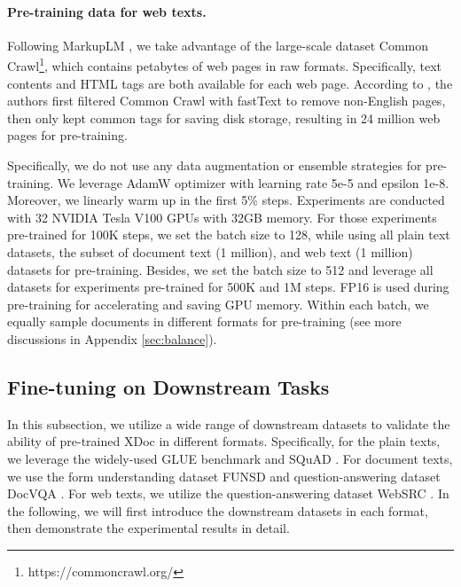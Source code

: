 \documentclass[11pt]{article}
\begin{document}
\paragraph{Pre-training data for web texts.} Following MarkupLM \cite{li2021markuplm}, we take advantage of the large-scale dataset Common Crawl\footnote{https://commoncrawl.org/}, which contains petabytes of web pages in raw formats. Specifically, text contents and HTML tags are both available for each web page. According to \cite{li2021markuplm}, the authors first filtered Common Crawl with fastText \cite{bojanowski2017enriching} to remove non-English pages, then only kept common tags for saving disk storage, resulting in 24 million web pages for pre-training.

Specifically, we do not use any data augmentation or ensemble strategies for pre-training. We leverage AdamW optimizer \cite{loshchilov2017decoupled} with learning rate 5e-5 and epsilon 1e-8. Moreover, we linearly warm up in the first 5\% steps. Experiments are conducted with 32 NVIDIA Tesla V100 GPUs with 32GB memory. For those experiments pre-trained for 100K steps, we set the batch size to 128, while using all plain text datasets, the subset of document text (1 million), and web text (1 million) datasets for pre-training. Besides, we set the batch size to 512 and leverage all datasets for experiments pre-trained for 500K and 1M steps. FP16 is used during pre-training for accelerating and saving GPU memory. Within each batch, we equally sample documents in different formats for pre-training (see more 
discussions in Appendix \ref{sec:balance}).


\subsection{Fine-tuning on Downstream Tasks}
In this subsection, we utilize a wide range of downstream datasets to validate the ability of pre-trained XDoc in different formats. Specifically, for the plain texts, we leverage the widely-used GLUE benchmark \cite{wang2018glue} and SQuAD \cite{rajpurkar2016squad,rajpurkar2018know}. For document texts, we use the form understanding dataset FUNSD \cite{jaume2019funsd} and question-answering dataset DocVQA \cite{mathew2021docvqa}. For web texts, we utilize the question-answering dataset WebSRC \cite{chen2021websrc}.  
In the following, we will first introduce the downstream datasets in each format, then demonstrate the experimental results in detail.
\end{document}
